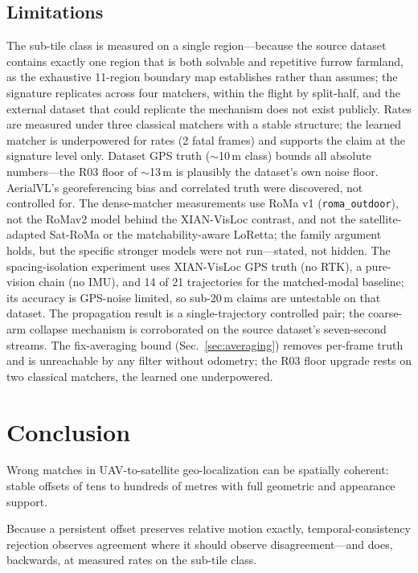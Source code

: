 \documentclass[journal]{IEEEtran}
\begin{document}
\subsection{Limitations}
The sub-tile class is measured on a single region---because the source dataset contains exactly one region that is both solvable and repetitive furrow farmland, as the exhaustive 11-region boundary map establishes rather than assumes; the signature replicates across four matchers, within the flight by split-half, and the external dataset that could replicate the mechanism does not exist publicly. Rates are measured under three classical matchers with a stable structure; the learned matcher is underpowered for rates (2 fatal frames) and supports the claim at the signature level only. Dataset GPS truth ($\sim$10\,m class) bounds all absolute numbers---the R03 floor of $\sim$13\,m is plausibly the dataset's own noise floor. AerialVL's georeferencing bias and correlated truth were discovered, not controlled for. The dense-matcher measurements use RoMa v1 (\texttt{roma\_outdoor}), not the RoMav2 model behind the XIAN-VisLoc contrast, and not the satellite-adapted Sat-RoMa or the matchability-aware LoRetta; the family argument holds, but the specific stronger models were not run---stated, not hidden. The spacing-isolation experiment uses XIAN-VisLoc GPS truth (no RTK), a pure-vision chain (no IMU), and 14 of 21 trajectories for the matched-modal baseline; its accuracy is GPS-noise limited, so sub-20\,m claims are untestable on that dataset. The propagation result is a single-trajectory controlled pair; the coarse-arm collapse mechanism is corroborated on the source dataset's seven-second streams. The fix-averaging bound (Sec.~\ref{sec:averaging}) removes per-frame truth and is unreachable by any filter without odometry; the R03 floor upgrade rests on two classical matchers, the learned one underpowered.

\section{Conclusion}

Wrong matches in UAV-to-satellite geo-localization can be spatially coherent: stable offsets of tens to hundreds of metres with full geometric and appearance support.

Because a persistent offset preserves relative motion exactly, temporal-consistency rejection observes agreement where it should observe disagreement---and does, backwards, at measured rates on the sub-tile class.
\end{document}
